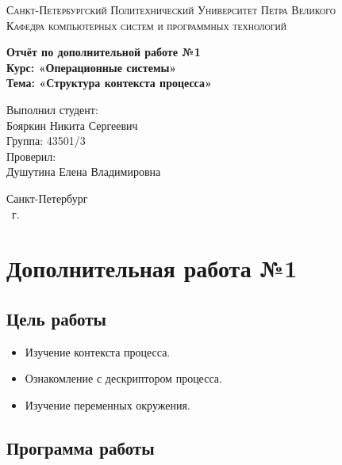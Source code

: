 \documentclass[14pt,a4paper,report]{report}
\begin{document}
\def\contentsname{Содержание}

\begin{titlepage}
	\begin{center}
		\textsc{Санкт-Петербургский Политехнический 
			Университет Петра Великого\\[5mm]
			Кафедра компьютерных систем и программных технологий}
		
		\vfill
		
		\textbf{Отчёт по дополнительной работе №1\\[3mm]
			Курс: «Операционные системы»\\[6mm]
			Тема: «Структура контекста процесса»\\[35mm]
		}
	\end{center}
	
	\hfill
	\begin{minipage}{.5\textwidth}
		Выполнил студент:\\[2mm] 
		Бояркин Никита Сергеевич\\
		Группа: 43501/3\\[5mm]
		
		Проверил:\\[2mm] 
		Душутина Елена Владимировна
	\end{minipage}
	\vfill
	\begin{center}
		Санкт-Петербург\\ \the\year\ г.
	\end{center}
\end{titlepage}

\tableofcontents
\clearpage

\chapter{Дополнительная работа №1}

\section{Цель работы}

\begin{itemize}
	\item Изучение контекста процесса.
	\item Ознакомление с дескриптором процесса.
	\item Изучение переменных окружения.
\end{itemize}

\section{Программа работы}
\end{document}
